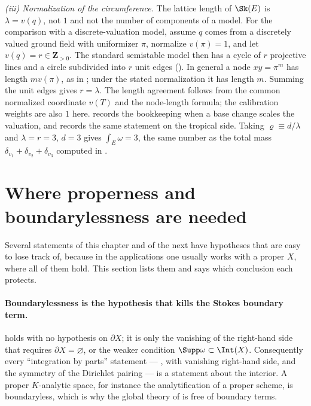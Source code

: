 \begin{example}
\emph{(iii) Normalization of the circumference.}  The lattice length of
$\Sk(E)$ is $\lambda=v(q)$, not $1$ and not the number of components of a
model.  For the comparison with a discrete-valuation model, assume
$q$ comes from a discretely valued ground field with uniformizer $\pi$,
normalize $v(\pi)=1$, and let $v(q)=r\in\mathbf Z_{>0}$.
The standard semistable model then has a cycle of $r$ projective lines
and a circle subdivided into $r$ unit edges
().  In general a node $xy=\pi^m$ has
length $m v(\pi)$, as in ; under the stated
normalization it has length $m$.  Summing the unit edges gives
$r=\lambda$.  The length agreement follows from the common normalized
coordinate $v(T)$ and the node-length formula; the calibration weights
are also $1$ here.   records the
bookkeeping when a base change scales the valuation, and
 records the same statement on the tropical side.
Taking $\varrho\equiv d/\lambda$ and $\lambda=r=3$, $d=3$ gives
$\int_E\omega=3$, the same number as the total mass
$\delta_{v_1}+\delta_{v_2}+\delta_{v_3}$ computed in
.
\end{example}

\section{Where properness and boundarylessness are needed}
\label{sec:ch13-properness}

Several statements of this chapter and of the next have hypotheses that are
easy to lose track of, because in the applications one usually works with a
proper $X$, where all of them hold.  This section lists them and says which
conclusion each protects.

\paragraph{Boundarylessness is the hypothesis that kills the Stokes boundary
term.}
 holds with no hypothesis on $\partial X$; it is only
the vanishing of the right-hand side that requires
$\partial X=\varnothing$, or the weaker condition
$\Supp\omega\subset\Int(X)$.  Consequently every ``integration by parts''
statement --- ,
 with vanishing right-hand side, and the
symmetry of the Dirichlet pairing --- is a statement about the interior.  A
proper $K$-analytic space, for instance the analytification of a proper
scheme, is boundaryless, which is why the global theory of
 is free of boundary terms.

